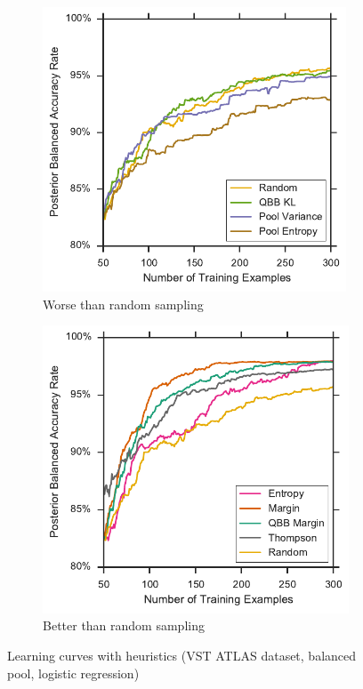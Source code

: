 \begin{figure}[p]
	\centering
	\begin{subfigure}{.5\textwidth}
		\centering
		\includegraphics[width=0.99\textwidth]{figures/5_active/vstatlas_br_ind_lower}
		\caption{Worse than random sampling}
		\label{fig:vstatlas_br_ind_lower}
	\end{subfigure}%
	\begin{subfigure}{.5\textwidth}
		\centering
		\includegraphics[width=0.99\linewidth]{figures/5_active/vstatlas_br_ind_upper}
		\caption{Better than random sampling}
		\label{fig:vstatlas_br_ind_upper}
	\end{subfigure}
	\caption[Learning curves with heuristics (VST ATLAS, balanced, logistic)]{
		Learning curves with heuristics (VST ATLAS dataset, balanced pool, logistic regression)}
	\label{fig:vstatlas_br_ind}
\end{figure}

